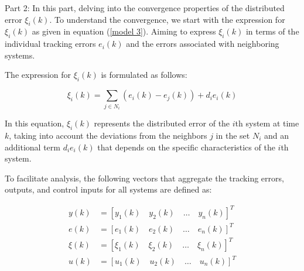\documentclass[journal,onecolumn]{IEEEtran}
\begin{document}










Part 2: In this part, delving into the convergence properties of the distributed error \(\xi_i(k)\). To understand the convergence, we start with the expression for \(\xi_i(k)\) as given in equation (\ref{model 3}). Aiming to express \(\xi_i(k)\) in terms of the individual tracking errors \(e_i(k)\) and the errors associated with neighboring systems.

The expression for \(\xi_i(k)\) is formulated as follows:

\begin{equation}
    \label{model 27}
    \xi_i(k) = \sum_{j \in N_i} (e_i(k) - e_j(k)) + d_i e_i(k)
\end{equation}

In this equation, \(\xi_i(k)\) represents the distributed error of the $i$th system at time \(k\), taking into account the deviations from the neighbors \(j\) in the set \(N_i\) and an additional term \(d_i e_i(k)\) that depends on the specific characteristics of the $i$th system.

To facilitate analysis, the following vectors that aggregate the tracking errors, outputs, and control inputs for all systems are defined as:

    
\begin{align*}
    y(k)   &= \left[ y_1(k) \quad y_2(k) \quad \dots \quad y_n(k) \right]^T \\
    e(k)   &= \left[ e_1(k) \quad e_2(k) \quad \dots \quad e_n(k) \right]^T \\ 
    \xi(k) &= \left[ \xi_1(k) \quad \xi_2(k) \quad \dots \quad \xi_n(k) \right]^T \\
    u(k)   &= \left[ u_1(k) \quad u_2(k) \quad \dots \quad u_n(k) \right]^T
    \end{align*}
    
\end{document}
